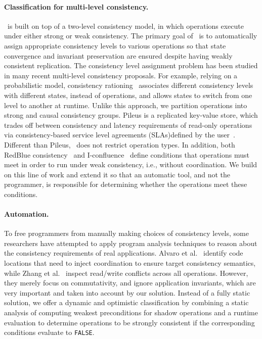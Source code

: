 \noindent\paragraph{Classification for multi-level consistency.}
\tool\ is built on top of a two-level consistency model, in which
operations execute under either strong or weak consistency. The primary goal of 
\tool\ is to automatically assign appropriate consistency levels to various 
operations so that state convergence and invariant preservation are ensured despite 
having weakly consistent replication. The consistency level assignment problem has been
studied in many recent multi-level consistency proposals. For example,
relying on a probabilistic model, consistency
rationing~\cite{Kraska2009ConsisRation} associates different
consistency levels with different states, instead of operations, and
allows states to switch from one level to another at runtime. Unlike
this approach, we partition operations into strong and causal
consistency groups. Pileus is a replicated key-value store,
which trades off between consistency and latency requirements of read-only operations
via consistency-based service level agreements (SLAs)defined by the user~\cite{Terry2013SLA}. 
Different than Pileus, \tool\ does not restrict operation types. In addition,
both RedBlue consistency~\cite{Li2012RedBlue} 
and I-confluence~\cite{Bailis2014Avoid} define conditions that
operations must meet in order to run under weak consistency, i.e.,
without coordination. We build on this line of work and extend
it so that an automatic tool, and not the programmer, is responsible
for determining whether the operations meet these conditions.

\noindent\paragraph{Automation.}
To free programmers from manually making choices of consistency levels, 
some researchers have attempted to apply program
analysis techniques to reason about the consistency requirements
of real applications. Alvaro et al.~\cite{Alvaro2011Bloom, Alvaro2014Blazes} identify code locations
that need to inject coordination to ensure target consistency semantics, while Zhang
et al.~\cite{Zhang2013TransactionChain} inspect read/write conflicts 
across all operations. However, they merely focus on commutativity, and ignore application invariants, which
are very important and taken into account by our solution. Instead
of a fully static solution, we offer a dynamic and optimistic classification by combining a static analysis of 
computing weakest preconditions for shadow operations and a runtime evaluation
to determine operations to be strongly consistent if
the corresponding conditions evaluate to {\tt FALSE}. 

